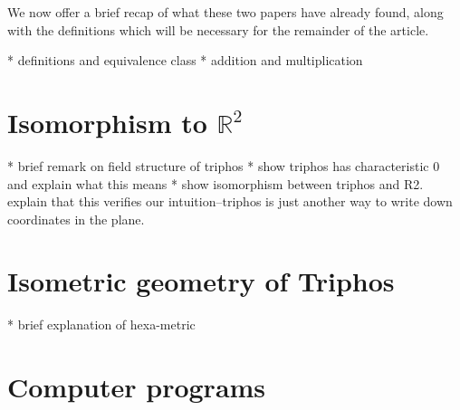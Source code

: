\documentclass{article}
\theoremstyle{plain}
\theoremstyle{definition}
\begin{document}
	We now offer a brief recap of what these two papers have already found,
	along with the definitions which will be necessary for the remainder of the
	article.

	* definitions and equivalence class
	* addition and multiplication


	\section{Isomorphism to \(\mathbb{R}^2\)}

	* brief remark on field structure of triphos
	* show triphos has characteristic 0 and explain what this means
	* show isomorphism between triphos and R2. explain that this verifies our
	intuition--triphos is just another way to write down coordinates in the
	plane.

	\section{Isometric geometry of Triphos}

	* brief explanation of hexa-metric

	\section{Computer programs}

	
	
\end{document}
